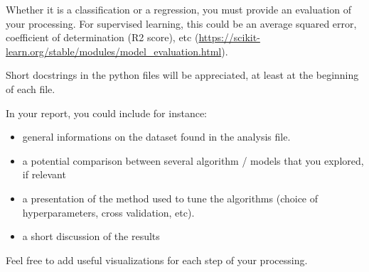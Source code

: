 \documentclass[10pt, a4paper]{article}
\begin{document}
\begin{Problem}
    Whether it is a classification or a regression, you must provide an evaluation of your processing. For supervised learning, this could be an average squared error, coefficient of determination (R2 score), etc (\url{https://scikit-learn.org/stable/modules/model_evaluation.html}).

    Short docstrings in the python files will be appreciated, at least at the beginning of each file.

    In your report, you could include for instance:
    \begin{itemize}
        \item general informations on the dataset found in the analysis file.
        \item a potential comparison between several algorithm / models that you explored, if relevant
        \item a presentation of the method used to tune the algorithms (choice of hyperparameters, cross validation, etc).
        \item a short discussion of the results
    \end{itemize}

    Feel free to add useful visualizations for each step of your processing.
\end{Problem}
\end{document}

